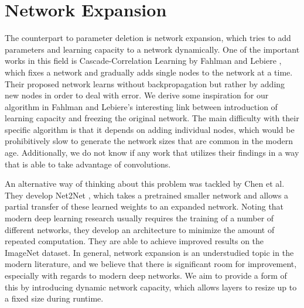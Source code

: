 \section{Network Expansion}
The counterpart to parameter deletion is network expansion, which tries to add parameters and learning capacity to a network dynamically.
One of the important works in this field is Cascade-Correlation Learning by Fahlman and Lebiere \cite{fahlman1990cascade}, which fixes a network and gradually adds single nodes to the network at a time.
Their proposed network learns without backpropagation but rather by adding new nodes in order to deal with error.
We derive some inspiration for our algorithm in Fahlman and Lebiere's interesting link between introduction of learning capacity and freezing the original network.
The main difficulty with their specific algorithm is that it depends on adding individual nodes, which would be prohibitively slow to generate the network sizes that are common in the modern age.
Additionally, we do not know if any work that utilizes their findings in a way that is able to take advantage of convolutions.

An alternative way of thinking about this problem was tackled by Chen et al. They develop Net2Net \cite{chen2015net2net}, which takes a pretrained smaller network and allows a partial transfer of these learned weights to an expanded network.
Noting that modern deep learning research usually requires the training of a number of different networks, they develop an architecture to minimize the amount of repeated computation.
They are able to achieve improved results on the ImageNet dataset.
In general, network expansion is an understudied topic in the modern literature, and we believe that there is significant room for improvement, especially with regards to modern deep networks.
We aim to provide a form of this by introducing dynamic network capacity, which allows layers to resize up to a fixed size during runtime.
